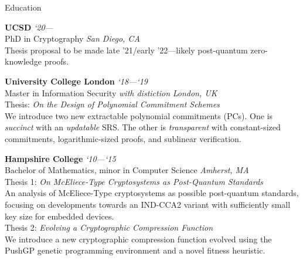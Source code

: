 \documentclass{cv}
\begin{document}
\begin{rSection}{Education}

\textbf{UCSD} \hfill \emph{`20---}  \\
PhD in Cryptography \hfill \emph{San Diego, CA} \\
{\small Thesis proposal to be made late '21/early '22---likely post-quantum zero-knowledge proofs.}

\textbf{University College London} \hfill \emph{`18---`19}  \\
Master in Information Security \emph{with distiction} \hfill \emph{London, UK} \\
Thesis: \emph{On the Design of Polynomial Commitment Schemes} \\
{\small We introduce two new extractable polynomial commitments (PCs). One is \emph{succinct} with an \emph{updatable} SRS. The other is \emph{transparent} with constant-sized commitments, logarithmic-sized proofs, and sublinear verification.}

\textbf{Hampshire College} \hfill \emph{`10---`15} \\
Bachelor of Mathematics, minor in Computer Science \hfill \emph{Amherst, MA} \\
Thesis 1: \emph{On McEliece-Type Cryptosystems as Post-Quantum Standards} \\
{\small An analysis of McEliece-Type cryptosystems as possible post-quantum standards, focusing on developments towards an IND-CCA2 variant with sufficiently small key size for embedded devices.} \\
Thesis 2: \emph{Evolving a Cryptographic Compression Function} \\
{\small We introduce a new cryptographic compression function evolved using the PushGP genetic programming environment and a novel fitness heuristic.}

\end{rSection}
\end{document}
